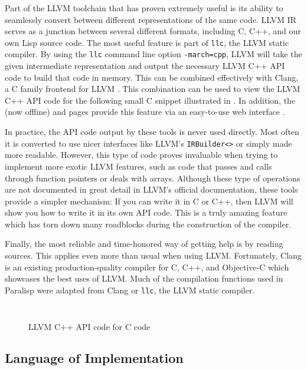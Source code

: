 \documentclass[abstracton]{scrartcl}
\begin{document}
Part of the LLVM toolchain that has proven extremely useful is its ability to seamlessly convert between different representations of the same code. LLVM IR serves as a junction between several different formats, including C, C++, and our own Lisp source code. The most useful feature is part of \texttt{llc}, the LLVM static compiler. By using the \texttt{llc} command line option \texttt{-march=cpp}, LLVM will take the given intermediate representation and output the necessary LLVM C++ API code to build that code in memory. This can be combined effectively with Clang, a C family frontend for LLVM \autocite{clang}. This combination can be used to view the LLVM C++ API code for the following small C snippet illustrated in . In addition, the  (now offline) and  pages provide this feature via an easy-to-use web interface \autocites{llvm-demo}{ellcc-demo}.

In practice, the API code output by these tools is never used directly. Most often it is converted to use nicer interfaces like LLVM's \texttt{IRBuilder<>} or simply made more readable. However, this type of code proves invaluable when trying to implement more exotic LLVM features, such as code that passes and calls through function pointers or deals with arrays. Although these type of operations are not documented in great detail in LLVM's official documentation, these tools provide a simpler mechanism: If you can write it in C or C++, then LLVM will show you how to write it in its own API code. This is a truly amazing feature which has torn down many roadblocks during the construction of the compiler.

Finally, the most reliable and time-honored way of getting help is by reading sources. This applies even more than usual when using LLVM\@. Fortunately, Clang is an existing production-quality compiler for C, C++, and Objective-C which showcases the best uses of LLVM\@. Much of the compilation functions used in Paralisp were adapted from Clang or \texttt{llc}, the LLVM static compiler.

\begin{figure}
  \inputminted[tabsize=4,frame=single,label=funcptr.c]{c}{code/funcptr.c}
  \inputminted[frame=single,label=Command line]{bash}{code/clang-llc-funcptr.bash}
  \caption{LLVM C++ API code for C code}\label{fig:llvm-api-for-c}
\end{figure}

\subsection{Language of Implementation}
\end{document}
